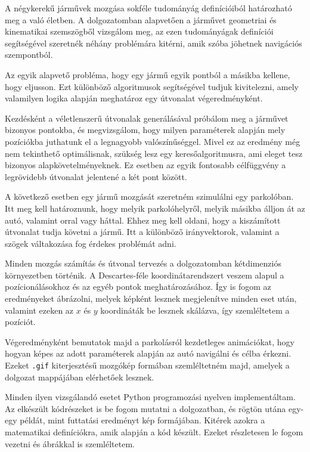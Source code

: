 
A négykerekű járművek mozgása sokféle tudományág definícióiból határozható meg a való életben. A dolgozatomban alapvetően a járművet geometriai és kinematikai szemszögből vizsgálom meg, az ezen tudományágak definíciói segítségével szeretnék néhány problémára kitérni, amik szóba jöhetnek navigációs szempontból.

Az egyik alapvető probléma, hogy egy jármű egyik pontból a másikba kellene, hogy eljusson. Ezt különböző algoritmusok segítségével tudjuk kivitelezni, amely valamilyen logika alapján meghatároz egy útvonalat végeredményként.

Kezdésként a véletlenszerű útvonalak generálásával próbálom meg a járművet bizonyos pontokba, és megvizsgálom, hogy milyen paraméterek alapján mely pozíciókba juthatunk el a legnagyobb valószínűséggel. Mivel ez az eredmény még nem tekinthető optimálisnak, szükség lesz egy keresőalgoritmusra, ami eleget tesz bizonyos alapkövetelményeknek. Ez esetben az egyik fontosabb célfüggvény a legrövidebb útvonalat jelentené a két pont között.

A következő esetben egy jármű mozgását szeretném szimulálni egy parkolóban. Itt meg kell határoznunk, hogy melyik parkolóhelyről, melyik másikba álljon át az autó, valamint orral vagy háttal. Ehhez meg kell oldani, hogy a kiszámított útvonalat tudja követni a jármű. Itt a különböző irányvektorok, valamint a szögek váltakozása fog érdekes problémát adni.

Minden mozgás számítás és útvonal tervezés a dolgozatomban kétdimenziós környezetben történik. A Descartes-féle koordinátarendszert veszem alapul a pozícionálásokhoz és az egyéb pontok meghatározásához. Így is fogom az eredményeket ábrázolni, melyek képként lesznek megjelenítve minden eset után, valamint ezeken az $x$ és $y$ koordináták be lesznek skálázva, így szemléltetem a pozíciót.

Végeredményként bemutatok majd a parkolásról kezdetleges animációkat, hogy hogyan képes az adott paraméterek alapján az autó navigálni és célba érkezni. Ezeket \texttt{.gif} kiterjesztésű mozgókép formában szemléltetném majd, amelyek a dolgozat mappájában elérhetőek lesznek.

Minden ilyen vizsgálandó esetet Python programozási nyelven implementáltam. Az elkészült kódrészeket is be fogom mutatni a dolgozatban, és rögtön utána egy-egy példát, mint futtatási eredményt kép formájában. Kitérek azokra a matematikai definíciókra, amik alapján a kód készült. Ezeket részletesen le fogom vezetni és ábrákkal is szemléltetem.
